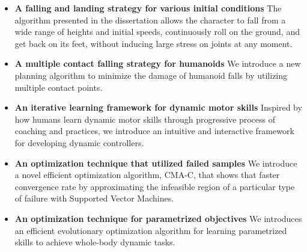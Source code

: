 \begin{itemize}
\item \textbf{A falling and landing strategy for various initial conditions}
  The algorithm presented in the dissertation allows the character to fall from 
  a wide range of heights and initial speeds, continuously roll on the ground, 
  and get back on its feet, without inducing large stress on joints at any
  moment.
\item \textbf{A multiple contact falling strategy for humanoids}
  We introduce a new planning algorithm to minimize the damage of humanoid 
  falls by utilizing multiple contact points. 
\item \textbf{An iterative learning framework for dynamic motor skills}
  Inspired by how humans learn dynamic motor skills through progressive process 
  of coaching and practices, we introduce an intuitive and interactive 
  framework for developing dynamic controllers. 
\item \textbf{An optimization technique that utilized failed samples}
  We introduce a novel efficient optimization algorithm, CMA-C, that shows 
  that faster convergence rate by approximating the infeasible region of a  
  particular type of failure with Supported Vector Machines.
\item \textbf{An optimization technique for parametrized objectives}
  We introduces an efficient evolutionary optimization algorithm for learning
  parametrized skills to achieve whole-body dynamic tasks. 
\end{itemize}

